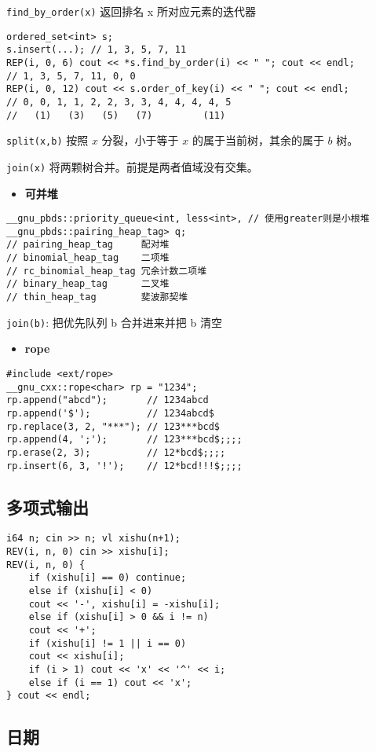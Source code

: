 \documentclass[a4paper,landscape,twocolumn]{ctexart}
\newcommand{\point}[1]{
	\begin{itemize}
		\item \textbf{#1}
	\end{itemize}
}
\begin{document}
\texttt{find\_by\_order(x)}  返回排名 x 所对应元素的迭代器

\begin{lstlisting}
ordered_set<int> s;
s.insert(...); // 1, 3, 5, 7, 11
REP(i, 0, 6) cout << *s.find_by_order(i) << " "; cout << endl;
// 1, 3, 5, 7, 11, 0, 0
REP(i, 0, 12) cout << s.order_of_key(i) << " "; cout << endl;
// 0, 0, 1, 1, 2, 2, 3, 3, 4, 4, 4, 4, 5
//   (1)   (3)   (5)   (7)         (11)
\end{lstlisting}

\texttt{split(x,b)} 按照 $x$ 分裂，小于等于 $x$ 的属于当前树，其余的属于 $b$ 树。

\texttt{join(x)} 将两颗树合并。前提是两者值域没有交集。

\point{可并堆}

\begin{lstlisting}
__gnu_pbds::priority_queue<int, less<int>, // 使用greater则是小根堆
__gnu_pbds::pairing_heap_tag> q;
// pairing_heap_tag     配对堆
// binomial_heap_tag    二项堆
// rc_binomial_heap_tag 冗余计数二项堆
// binary_heap_tag      二叉堆
// thin_heap_tag        斐波那契堆
\end{lstlisting}

\texttt{join(b)}: 把优先队列 b 合并进来并把 b 清空

\point{rope}

\begin{lstlisting}
#include <ext/rope>
__gnu_cxx::rope<char> rp = "1234";
rp.append("abcd");       // 1234abcd
rp.append('$');          // 1234abcd$
rp.replace(3, 2, "***"); // 123***bcd$
rp.append(4, ';');       // 123***bcd$;;;;
rp.erase(2, 3);          // 12*bcd$;;;;
rp.insert(6, 3, '!');    // 12*bcd!!!$;;;;
\end{lstlisting}

\subsection{多项式输出}

\begin{lstlisting}
i64 n; cin >> n; vl xishu(n+1);
REV(i, n, 0) cin >> xishu[i];
REV(i, n, 0) {
	if (xishu[i] == 0) continue;
	else if (xishu[i] < 0)
	cout << '-', xishu[i] = -xishu[i];
	else if (xishu[i] > 0 && i != n)
	cout << '+';
	if (xishu[i] != 1 || i == 0)
	cout << xishu[i];
	if (i > 1) cout << 'x' << '^' << i;
	else if (i == 1) cout << 'x';
} cout << endl;
\end{lstlisting}

\subsection{日期}
\end{document}

